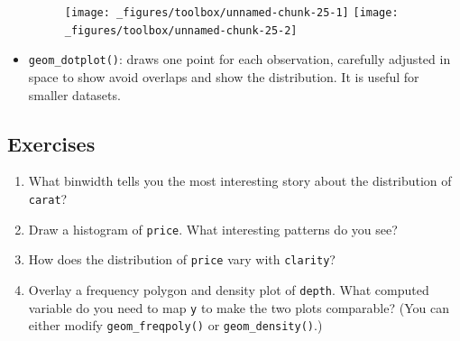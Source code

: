 \begin{itemize}
\begin{Shaded}
\begin{Highlighting}[]
\StringTok{ }
\StringTok{  }\NormalTok{()}
\StringTok{ }
\StringTok{  }\NormalTok{(}\NormalTok{(} \NormalTok{))) +}\StringTok{ }
\StringTok{  }\NormalTok{(}\NormalTok{, }\NormalTok{)}
\end{Highlighting}
\end{Shaded}

  \begin{figure}[H]
    \texttt{[image: \_figures/toolbox/unnamed-chunk-25-1]}%
    \texttt{[image: \_figures/toolbox/unnamed-chunk-25-2]}
  \end{figure}
\item
  \texttt{geom\_dotplot()}: draws one point for each observation,
  carefully adjusted in space to show avoid overlaps and show the
  distribution. It is useful for smaller datasets.
   
\end{itemize}

\subsection{Exercises}

\begin{enumerate}
\def\labelenumi{\arabic{enumi}.}
\item
  What binwidth tells you the most interesting story about the
  distribution of \texttt{carat}?
\item
  Draw a histogram of \texttt{price}. What interesting patterns do you
  see?
\item
  How does the distribution of \texttt{price} vary with
  \texttt{clarity}?
\item
  Overlay a frequency polygon and density plot of \texttt{depth}. What
  computed variable do you need to map \texttt{y} to make the two plots
  comparable? (You can either modify \texttt{geom\_freqpoly()} or
  \texttt{geom\_density()}.)
\end{enumerate}

